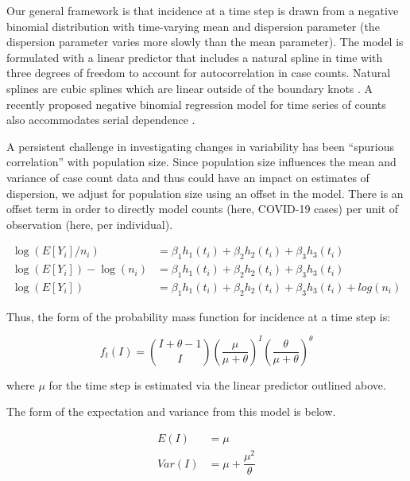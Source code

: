 \documentclass[10pt,letterpaper]{article}
\begin{document}
Our general framework is that incidence at a time step is drawn from a negative binomial distribution with time-varying mean and dispersion parameter (the dispersion parameter varies more slowly than the mean parameter). 
The model is formulated with a linear predictor that includes a natural spline in time with three degrees of freedom to account for autocorrelation in case counts. 
Natural splines are cubic splines which are linear outside of the boundary knots \cite{perperoglou_review_2019}. 
A recently proposed negative binomial regression model for time series of counts also accommodates serial dependence \cite{davis_negative_2009}. 

A persistent challenge in investigating changes in variability has been ``spurious correlation'' with population size. 
Since population size influences the mean and variance of case count data and thus could have an impact on estimates of dispersion, we adjust for population size using an offset in the model. 
There is an offset term in order to directly model counts (here, COVID-19 cases) per unit of observation (here, per individual).

\begin{align}
  \log(E[Y_i]/n_i) &= \beta_1h_1(t_i) + \beta_2h_2(t_i) + \beta_3h_3(t_i) \\
  \log(E[Y_i])-\log(n_i) &= \beta_1h_1(t_i) + \beta_2h_2(t_i) + \beta_3h_3(t_i) \\ 
  \log(E[Y_i]) &= \beta_1 h_1(t_i) + \beta_2h_2(t_i) + \beta_3 h_3(t_i) + log(n_i) 
\end{align}

Thus, the form of the probability mass function for incidence at a time step is:

\begin{equation}
  f_t(I) = \binom{I + \theta - 1}{I} \left(\dfrac{\mu}{\mu+\theta}\right)^I \left(\dfrac{\theta}{\mu +\theta}\right)^\theta
\end{equation}

where \begin{math}\mu\end{math} for the time step is estimated via the linear predictor outlined above.

The form of the expectation and variance from this model is below.

\begin{align}
  E(I) &= \mu\\
  Var(I) &= \mu + \dfrac{\mu^2}{\theta}
\end{align}
\end{document}
